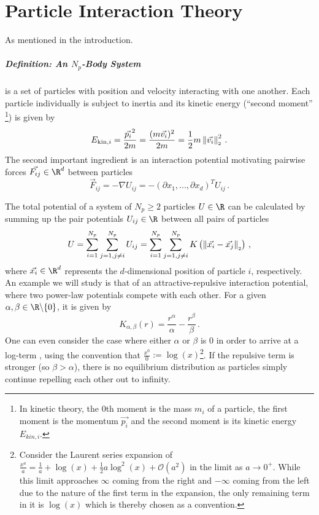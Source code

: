 \chapter{Particle Interaction Theory}
\label{chap:particle-interaction-theory}

As mentioned in the introduction.

\paragraph{Definition: An $N_p$-Body System}
is a set of particles with position and velocity interacting with one another.
Each particle individually is subject to inertia and its kinetic energy (``second moment'' \footnote{
  In kinetic theory, the $0$th moment is the mass $m_i$ of a particle, the first moment is the momentum $\vec{p_i}$ and the second moment is its kinetic energy $E_{kin,i}$.
}) is given by
$$E_{\text{kin},i} = \frac{\vec{p_i}^2}{2m} = \frac{(m \vec{v_i})^2}{2m} = \frac{1}{2} m \left\lVert\vec{v_i}\right\rVert_{\scriptscriptstyle 2}^2\,.$$
The second important ingredient is an interaction potential motivating pairwise forces $\vec{F_{ij}} \in \R^d$ between particles
$$\vec{F}_{ij} = -\nabla U_{ij} = -\left(\partial x_1, ..., \partial x_d\right)^T U_{ij}\,.$$

The total potential of a system of $N_p \ge 2$ particles $U \in \R$ can be calculated by summing up the pair potentials $U_{ij} \in \R$ between all pairs of particles
$$U = \sum_{i=1}^{N_p}\sum_{j=1, j \neq i}^{N_p} U_{ij} = \sum_{i=1}^{N_p}\sum_{j=1, j \neq i}^{N_p} K\left(\left\lVert\vec{x_i} - \vec{x_j}\right\rVert_{\scriptscriptstyle 2}\right)\,,$$
where $\vec{x_i} \in \R^d$ represents the $d$-dimensional position of particle $i$, respectively.
An example we will study is that of an attractive-repulsive interaction potential, where two power-law potentials compete with each other.
For a given $\alpha, \beta \in \R \backslash \{0\}$, it is given by
$$K_{\alpha, \beta}(r) = \frac{r^\alpha}{\alpha} - \frac{r^\beta}{\beta}\,.$$
One can even consider the case where either $\alpha$ or $\beta$ is 0 in order to arrive at a log-term \parencite{2017-explicit-solutions}, using the convention that $\frac{x^0}{0} := \log(x)$\footnote{
  Consider the Laurent series expansion of $\frac{x^a}{a} = \frac{1}{a} + \log(x) + \frac{1}{2}a \log^2(x) + \mathcal{O}(a^2)$ in the limit as $a \rightarrow 0^+$.
  While this limit approaches $\infty$ coming from the right and $-\infty$ coming from the left due to the nature of the first term in the expansion, the only remaining term in it is $\log(x)$ which is thereby chosen as a convention.
}.
If the repulsive term is stronger (so $\beta > \alpha$), there is no equilibrium distribution as particles simply continue repelling each other out to infinity.


